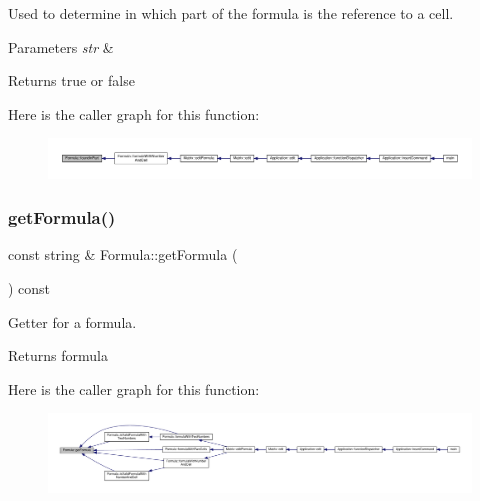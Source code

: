 Used to determine in which part of the formula is the reference to a cell. 
\begin{DoxyParams}{Parameters}
{\em str} & \\
\hline
\end{DoxyParams}
\begin{DoxyReturn}{Returns}
true or false 
\end{DoxyReturn}
Here is the caller graph for this function\+:
\nopagebreak
\begin{figure}[H]
\begin{center}
\leavevmode
\includegraphics[width=350pt]{class_formula_a79079cea46f8320cd7a63f576251baac_icgraph}
\end{center}
\end{figure}
\mbox{\label{class_formula_a1b9557287ed502f9523c5c7b1805bac1}} 
\subsubsection{\texorpdfstring{get\+Formula()}{getFormula()}}
{\footnotesize\ttfamily const string \& Formula\+::get\+Formula (\begin{DoxyParamCaption}{ }\end{DoxyParamCaption}) const}

Getter for a formula. \begin{DoxyReturn}{Returns}
formula 
\end{DoxyReturn}
Here is the caller graph for this function\+:
\nopagebreak
\begin{figure}[H]
\begin{center}
\leavevmode
\includegraphics[width=350pt]{class_formula_a1b9557287ed502f9523c5c7b1805bac1_icgraph}
\end{center}
\end{figure}
\mbox{\label{class_formula_a8080ff3cf8fce2d9f1730e772ae21c71}} 
